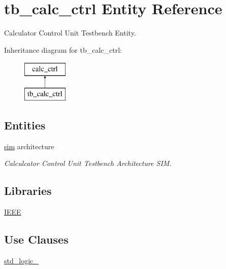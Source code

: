 \hypertarget{classtb__calc__ctrl}{}\section{tb\+\_\+calc\+\_\+ctrl Entity Reference}
\label{classtb__calc__ctrl}


Calculator Control Unit Testbench Entity.  


Inheritance diagram for tb\+\_\+calc\+\_\+ctrl\+:\begin{figure}[H]
\begin{center}
\leavevmode
\includegraphics[height=2.000000cm]{classtb__calc__ctrl}
\end{center}
\end{figure}
\subsection*{Entities}
\begin{DoxyCompactItemize}
\item 
\hyperlink{classtb__calc__ctrl_1_1sim}{sim} architecture
\begin{DoxyCompactList}\small\item\em Calculcator Control Unit Testbench Architecture S\+IM. \end{DoxyCompactList}\end{DoxyCompactItemize}
\subsection*{Libraries}
 \begin{DoxyCompactItemize}
\item 
\hyperlink{classtb__calc__ctrl_ae4f03c286607f3181e16b9aa12d0c6d4}{I\+E\+EE} 
\end{DoxyCompactItemize}
\subsection*{Use Clauses}
 \begin{DoxyCompactItemize}
\item 
\hyperlink{classtb__calc__ctrl_acd03516902501cd1c7296a98e22c6fcb}{std\+\_\+logic\+\_}   
\end{DoxyCompactItemize}



